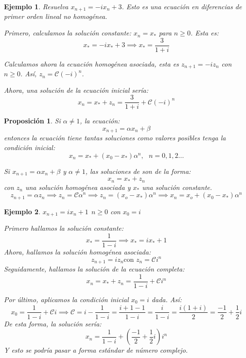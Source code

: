 \documentclass[11pt, a4paper, titlepage]{article}
\makeatletter
\renewenvironment{proof}[1][\proofname] {\vspace{-15pt}\par\pushQED{\qed}\normalfont\topsep6\p@\@plus6\p@\relax\trivlist\item[\hskip\labelsep\it#1\@addpunct{.}]\ignorespaces}{\popQED\endtrivlist\@endpefalse}
\theoremstyle{theorem-style}
\newtheorem*{nprop}{Proposición}
\theoremstyle{definition-style}
\theoremstyle{remark-style}
\theoremstyle{example-style}
\newtheorem*{ejemplo}{Ejemplo}
\makeatother
\begin{document}
\begin{ejemplo}
	Resuelva $x_{n+1} = -ix_n + 3$. Esto es una ecuación en diferencias de primer orden lineal no homogénea.
	\begin{proof}[Solución]
	Primero, calculamos la solución constante: $x_n = x_*$ para $n \geq 0$. Esta es:
	\[
	x_* = -i x_* +3 \implies x_* = \frac{3}{1+i}
	\]
	
	Calculamos ahora la ecuación homogénea asociada, esta es $z_{n+1} = -iz_n$ con $n \geq 0$. Así, $z_n =  \mathcal{C}(-i)^n$.
	
	Ahora, una solución de la ecuación inicial sería:
	\[
	x_n =  x_* +z_n = \frac{3}{1+i}+\mathcal{C}(-i)^n
	\]
\end{proof}

\end{ejemplo}

\begin{nprop}
	Si $\alpha \ne 1$, la ecuación:
	\[
	x_{n+1} = \alpha x_n + \beta
	\]
	entonces la ecuación tiene tantas soluciones como valores posibles tenga la condición inicial:
	\[
	x_n = x_* + (x_0-x_*)\alpha^n , \ \ \ n=0,1,2...
	\]
	
	\begin{proof}
	Si $x_{n+1} = \alpha x_n + \beta$ y $\alpha \ne 1$, las soluciones de son de la forma:
	\[
	x_n = x_*+z_n 
	\]
	con $z_n$ una solución homogénea asociada y $x_*$ una solución constante.
	\[
	z_{n+1} = \alpha z_n \implies z_{n} = \mathcal{C}\alpha^n \implies z_n = (x_o - x_*)\alpha^n \implies x_n = x_o + (x_0 - x_*)\alpha^n
	\]
	
\end{proof}

\end{nprop}


\begin{ejemplo}
	$x_{n+1}=ix_n+1 \ \ n \geq 0$ con $x_0=i$
	\begin{proof}[Solución]
	Primero hallamos la solución constante:
	\[
	x_* = \frac{1}{1-i} \implies x_* = ix_* +1
	\]
	Ahora, hallamos la solución homogénea asociada:
	\[
	z_{n+1} = iz_n \text{con $z_n = \mathcal{C}i^n$}
	\]
	Seguidamente, hallamos la solución de la ecuación completa:
	\[
	x_n = x_* + z_n = \frac{1}{1-i}+ \mathcal{C}i^n
	\]
	
	Por último, aplicamos la condición inicial $x_0=i$ dada. Así:
	\[
	x_0 = \frac{1}{1-i}+ \mathcal{C}i \implies \mathcal{C} = i-\frac{1}{1-i} =  \frac{i+1-1}{1-i} = \frac{i}{1-i} = \frac{i(1+i)}{2} = \frac{-1}{2}+ \frac{1}{2}i
	\]
	De esta forma, la solución sería:
	\[
	x_n = \frac{1}{1-i} + (\frac{-1}{2}+ \frac{1}{2}i)i^n
	\]
	Y esto se podría pasar a forma estándar de número complejo.
\end{proof}
\end{ejemplo}
\end{document}
